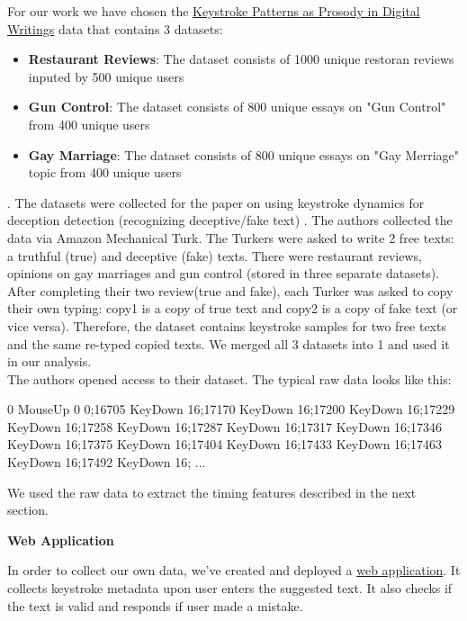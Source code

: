 \documentclass[12pt,a4]{article}
\begin{document}
\normalsize
For our work we have chosen the  \href{http://www3.cs.stonybrook.edu/~rbanerjee/project-pages/keystrokes/keystrokes.html}{Keystroke Patterns as Prosody in Digital Writings} data \cite{banerjee2014_emnlp} that contains 3 datasets: \begin{itemize}
	\item \textbf{Restaurant Reviews}: The dataset consists of 1000 unique restoran reviews inputed by 500 unique users
	\item \textbf{Gun Control}: The dataset consists of 800 unique essays on "Gun Control" from 400 unique users
	\item \textbf{Gay Marriage}: The dataset consists of 800 unique essays on "Gay Merriage" topic  from 400 unique users
\end{itemize}.
The datasets were collected for the paper on using keystroke dynamics for 
deception detection (recognizing deceptive/fake text) \cite{banerjee2014_emnlp}. The authors collected the data via Amazon Mechanical Turk. The Turkers were asked to write 2 free texts: a truthful (true) and deceptive (fake) texts. There were restaurant reviews, opinions on gay marriages and gun control (stored in three separate datasets). After completing their two review(true and fake), each Turker was asked to copy their own typing: copy1 is a copy of true text and copy2 is a copy of fake text (or vice versa). Therefore, the dataset contains keystroke samples for two free texts and the same re-typed copied texts. We merged all 3 datasets into 1 and used it in our analysis. \\

The authors opened access to their dataset. The typical raw data looks like this: 
\bigskip

\begin{text}
	0 MouseUp 0 0;16705 KeyDown 16;17170 KeyDown 16;17200 KeyDown 16;17229 KeyDown 16;17258 KeyDown 16;17287 KeyDown 16;17317 KeyDown 16;17346 KeyDown 16;17375 KeyDown 16;17404 KeyDown 16;17433 KeyDown 16;17463 KeyDown 16;17492 KeyDown 16; ...
\end{text}
\bigskip

We used the raw data to extract the timing features described in the next section.

\bigskip
\large\textbf{Web Application}
\bigskip

\normalsize
In order to collect our own data, we've created and deployed a \href{https://powerful-spire-05992.herokuapp.com/}{web application}. It collects keystroke metadata upon user enters the suggested text. It also checks if the text is valid and responds if user made a mistake.
\end{document}

